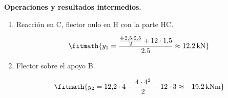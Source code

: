 \noindent\textbf{Operaciones y resultados intermedios.}

\begin{enumerate}

\item Reacción en C, flector nulo en H con la parte HC.

\[\fitmath{y_{1}=\frac{\frac{4\cdot 2{,}5\cdot 2{,}5}{2}+12\cdot 1{,}5}{2.5}\approx 12{,}2\,\mathrm{kN}}\]

\item Flector sobre el apoyo B.

\[\fitmath{y_{2}=12{,}2\cdot 4-\frac{4\cdot {4}^{2}}{2}-12\cdot 3\approx -19{,}2\,\mathrm{kN m}}\]

\end{enumerate}
